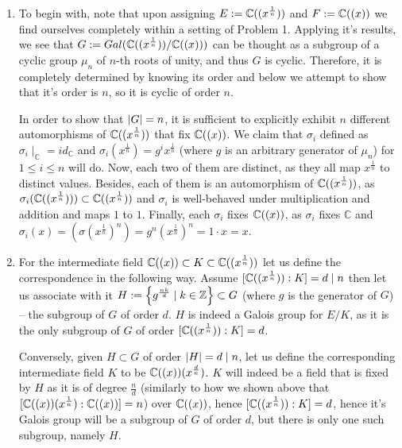 \documentclass[8pt]{article} %
\begin{document}
\begin{enumerate}[label=\bfseries Problem \arabic*.]
{\begin{enumerate}[label=(\arabic*).]
{				Thus $\E/\F$ is normal and separable, and hence Galois. 
				}
			\item{To begin with, note that upon assigning $E:=\mathbb{C}((x^{\frac{1}{n}}))$ and $F:=\mathbb{C}((x))$ we find ourselves completely within
				a setting of Problem 1. Applying it's results, we see that $G:=Gal(\mathbb{C}((x^{\frac{1}{n}}))/\mathbb{C}((x)))$ can be thought
				as a subgroup of a cyclic group $\mu_n$ of $n$-th roots of unity, and thus $G$ is cyclic. Therefore,
				it is completely determined by knowing its order and below we attempt to show that it's order is $n$,
				so it is cyclic of order $n$.

				In order to show that $\left|G\right|=n$, it is sufficient to explicitly exhibit $n$ different
				automorphisms of $\mathbb{C}((x^{\frac{1}{n}}))$ that fix $\mathbb{C}((x))$. We claim that $\sigma_i$ defined as $\sigma_i\mid_\mathbb{C}
				=id_\mathbb{C}$
				and $\sigma_i(x^{\frac{1}{n}})=g^ix^{\frac{1}{n}}$ (where $g$ is an arbitrary generator of $\mu_n$)
				for $1\leq i\leq n$ will do. Now, each two of them are distinct, as they all map $x^{\frac{1}{n}}$
				to distinct values. Besides, each of them is an automorphism of $\mathbb{C}((x^{\frac{1}{n}}))$, as $\sigma_i(\mathbb{C}((x^{\frac{1}{n}})))\subset\mathbb{C}((x^{\frac{1}{n}}))$
				and $\sigma_i$ is well-behaved under multiplication and addition and maps $1$ to $1$. Finally,
				each $\sigma_i$ fixes $\mathbb{C}((x))$, as $\sigma_i$ fixes $\mathbb{C}$ and $\sigma_i(x)=(\sigma(x^{\frac{1}{n}})
				^n)=g^n(x^{\frac{1}{n}})^n=1\cdot x=x$.
				}
			\item{For the intermediate field $\mathbb{C}((x))\subset K\subset\mathbb{C}((x^{\frac{1}{n}}))$ let us define the correspondence in the following way. Assume $[\mathbb{C}((x^{\frac{1}{n}})):K]=d\mid n$
				then let us associate with it $H:=\left\{g^{\frac{nk}{d}}\mid k\in\mathbb{Z}\right\}\subset G$ (where $g$ is the generator of $G$) -- the 
				subgroup of $G$ of order $d$. $H$ is indeed a Galois group for $E/K$, as it is the only subgroup of $G$ of order $[\mathbb{C}((x^{\frac{1}{n}})):K]=d$. 
				
				Conversely, given $H\subset G$ of order $\left|H\right|=d\mid n$, let us define the corresponding intermediate field $K$ to be
				$\mathbb{C}((x))(x^{\frac{d}{n}})$. $K$ will indeed be a field that is fixed by $H$ as it is of degree $\frac{n}{d}$ (similarly to how we shown
				above that $[\mathbb{C}((x))(x^{\frac{1}{n}}):\mathbb{C}((x))]=n$) over $\mathbb{C}((x))$, hence $[\mathbb{C}((x^{\frac{1}{n}})):K]=d$, hence it's Galois group will be a subgroup of $G$ of order
				$d$, but there is only one such subgroup, namely $H$.
				}
		\end{enumerate}
		}
\end{enumerate}
\end{document}
